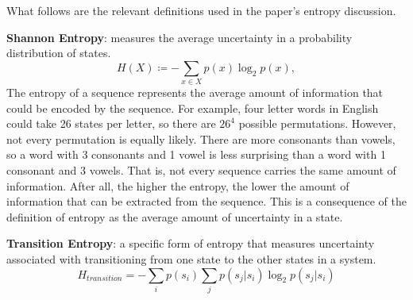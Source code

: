 \documentclass[11pt]{amsart}
\begin{document}
What follows are the relevant definitions used in the paper's entropy discussion.

\textbf{Shannon Entropy}: measures the average uncertainty in a probability distribution of states.
\begin{equation}
    \label{entropyeq}
    H( X ) ≔ - \sum_{x ∈ X}p( x )\log_2 p( x ),
\end{equation}
The entropy of a sequence represents the average amount of information that could be encoded by the sequence.
For example, four letter words in English could take 26 states per letter, so there are $26^4$ possible permutations.
However, not every permutation is equally likely.
There are more consonants than vowels, so a word with 3 consonants and 1 vowel is less surprising than a word with 1 consonant and 3 vowels.
That is, not every sequence carries the same amount of information.
After all, the higher the entropy, the lower the amount of information that can be extracted from the sequence.
This is a consequence of the definition of entropy as the average amount of uncertainty in a state.

\textbf{Transition Entropy}: a specific form of entropy that measures uncertainty associated with transitioning from one state to the other states in a system.
\begin{equation}
    \label{transition_entropy}
    H_{transition} = -\sum_i p( s_i )\sum_j p( s_j|s_i )\log_2 p( s_j|s_i )
\end{equation}
\end{document}

